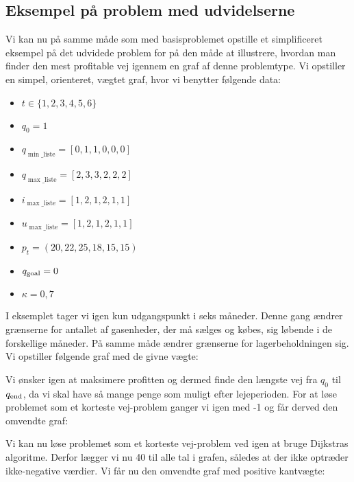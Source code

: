 \subsection{Eksempel på problem med udvidelserne} \label{kap:grafen_for_udvidet}
Vi kan nu på samme måde som med basisproblemet opstille et simplificeret eksempel på det udvidede problem for på den måde at illustrere, hvordan man finder den mest profitable vej igennem en graf af denne problemtype. Vi opstiller en simpel, orienteret, vægtet graf, hvor vi benytter følgende data:

\begin{itemize}
  \item $t \in \{1,2,3,4,5,6\}$
  \item $q_{0}=1$
  \item $q_{\min \_ \textrm{liste}}=[0,1,1,0,0,0]$
  \item $q_{\max \_ \textrm{liste}}=[2,3,3,2,2,2]$
  \item $i_{\max \_ \textrm{liste}}=[1,2,1,2,1,1]$
  \item $u_{\max \_ \textrm{liste}}=[1,2,1,2,1,1]$
  \item $p_{t}=(20,22,25,18,15,15)$
  \item $q_{\textrm{goal}}=0$
  \item $\kappa=0,7$
\end{itemize}

I eksemplet tager vi igen kun udgangspunkt i seks måneder. Denne gang ændrer grænserne for antallet af gasenheder, der må sælges og købes, sig løbende i de forskellige måneder. På samme måde ændrer grænserne for lagerbeholdningen sig. Vi opstiller følgende graf med de givne vægte:



Vi ønsker igen at maksimere profitten og dermed finde den længste vej fra $q_{0}$ til $q_{\textrm{end}}$, da vi skal have så mange penge som muligt efter lejeperioden. For at løse problemet som et korteste vej-problem ganger vi igen med -1 og får derved den omvendte graf:



Vi kan nu løse problemet som et korteste vej-problem ved igen at bruge Dijkstras algoritme. Derfor lægger vi nu 40 til alle tal i grafen, således at der ikke optræder ikke-negative værdier. Vi får nu den omvendte graf med positive kantvægte:




